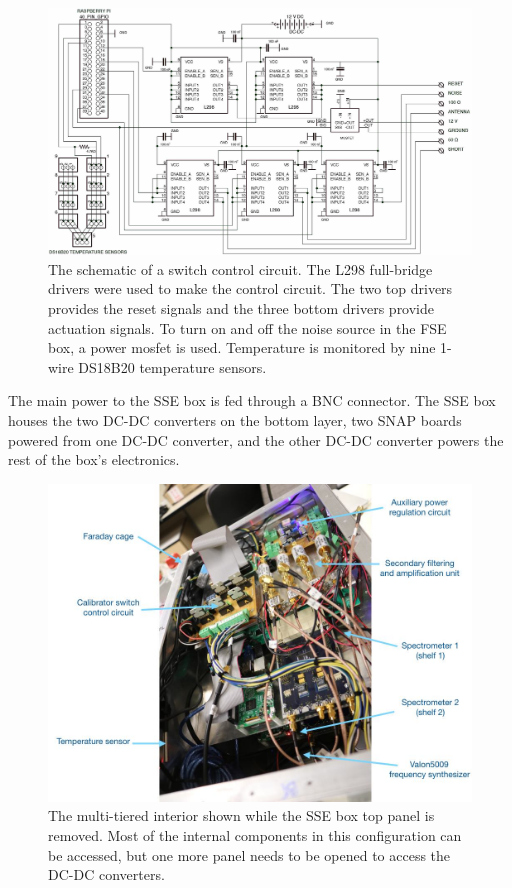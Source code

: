 \begin{figure}
\centering
\includegraphics[width=\linewidth]{Figures/calibrator}
\caption{The schematic of a switch control circuit. The L298 full-bridge drivers were used to make the control circuit. The two top drivers provides the reset signals and the three bottom drivers provide actuation signals. To turn on and off the noise source in the FSE box, a power mosfet is used. Temperature is monitored by nine 1-wire DS18B20 temperature sensors.}
\label{Fig:calibrator}
\end{figure}

The main power to the SSE box is fed through a BNC connector. The SSE box houses the two DC-DC converters on the bottom layer, two SNAP boards powered from one DC-DC converter, and the other DC-DC converter powers the rest of the box's electronics. 

\begin{figure}
	\centering
	\includegraphics[width=\linewidth]{Figures/enclosure_ann}
	\caption{The multi-tiered interior shown while the SSE box top panel is removed. Most of the internal components in this configuration can be accessed, but one more panel needs to be opened to access the DC-DC converters.}
	\label{Fig:enclosure_ann}
\end{figure}

